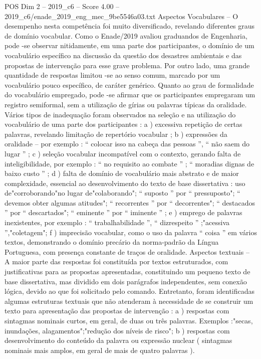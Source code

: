 \begin{textsample}{POS Dim 2 – 2019\_c6 – Score 4.00 – 2019\_c6/enade\_2019\_eng\_mec\_9be5546a03.txt}
Aspectos Vocabulares – O desempenho nesta competência foi muito diversificado, revelando diferentes graus de domínio vocabular.
Como o Enade/2019 avaliou graduandos de Engenharia, pode -se observar nitidamente, em uma parte dos participantes, o domínio de um vocabulário específico na discussão da questão dos desastres ambientais e das propostas de intervenção para esse grave problema.
Por outro lado, uma grande quantidade de respostas limitou -se ao senso comum, marcado por um vocabulário pouco específico, de caráter genérico.
Quanto ao grau de formalidade do vocabulário empregado, pode -se afirmar que os participantes empregaram um registro semiformal, sem a utilização de gírias ou palavras típicas da oralidade.
Vários tipos de inadequação foram observados na seleção e na utilização do vocabulário de uma parte dos participantes : a ) excessiva repetição de certas palavras, revelando limitação de repertório vocabular ; b ) expressões da oralidade – por exemplo : “ colocar isso na cabeça das pessoas ”, “ não saem do lugar ” ; c ) seleção vocabular incompatível com o contexto, gerando falta de inteligibilidade, por exemplo : “ no requisito ao combate ” ; “ moradias dignas de baixo custo ” ; d ) falta de domínio de vocabulário mais abstrato e de maior complexidade, essencial ao desenvolvimento do texto de base dissertativa : uso de"corroborando"no lugar de"colaborando"; “ suposto ” por “ pressuposto"; “ devemos obter algumas atitudes"; “ recorrentes ” por “ decorrentes"; “ destacados ” por “ descartados"; “ eminente ” por “ iminente ” ; e ) emprego de palavras inexistentes, por exemplo : “ trabalhabilidade ”, “ dizrespeito ” ;"acessiva ”,"coletagem"; f ) imprecisão vocabular, como o uso da palavra “ coisa ” em vários textos, demonstrando o domínio precário da norma-padrão da Língua Portuguesa, com presença constante de traços de oralidade.
Aspectos textuais – A maior parte das respostas foi constituída por textos estruturados, com justificativas para as propostas apresentadas, constituindo um pequeno texto de base dissertativa, mas dividido em dois parágrafos independentes, sem conexão lógica, devido ao que foi solicitado pelo comando.
Entretanto, foram identificadas algumas estruturas textuais que não atenderam à necessidade de se construir um texto para apresentação das propostas de intervenção : a ) respostas com sintagmas nominais curtos, em geral, de duas ou três palavras.
Exemplos :"secas, inundações, alagamentos";"redução dos níveis de risco"; b ) respostas com desenvolvimento do conteúdo da palavra ou expressão nuclear ( sintagmas nominais mais amplos, em geral de mais de quatro palavras ).

\end{textsample}
